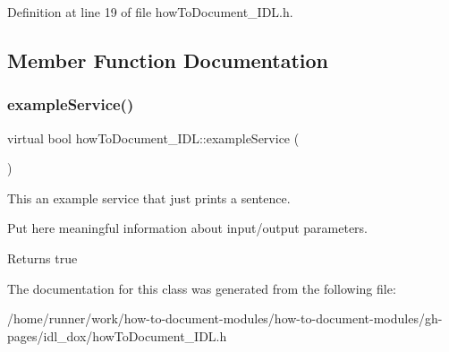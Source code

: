Definition at line 19 of file how\+To\+Document\+\_\+\+I\+D\+L.\+h.



\subsection{Member Function Documentation}
\mbox{\label{classhowToDocument__IDL_a530964d66092c8ddbcfb194d7d89b733}} 
\subsubsection{\texorpdfstring{example\+Service()}{exampleService()}}
{\footnotesize\ttfamily virtual bool how\+To\+Document\+\_\+\+I\+D\+L\+::example\+Service (\begin{DoxyParamCaption}{ }\end{DoxyParamCaption})\hspace{0.3cm}{\ttfamily [virtual]}}



This an example service that just prints a sentence. 

Put here meaningful information about input/output parameters. \begin{DoxyReturn}{Returns}
true 
\end{DoxyReturn}


The documentation for this class was generated from the following file\+:\begin{DoxyCompactItemize}
\item 
/home/runner/work/how-\/to-\/document-\/modules/how-\/to-\/document-\/modules/gh-\/pages/idl\+\_\+dox/how\+To\+Document\+\_\+\+I\+D\+L.\+h\end{DoxyCompactItemize}
